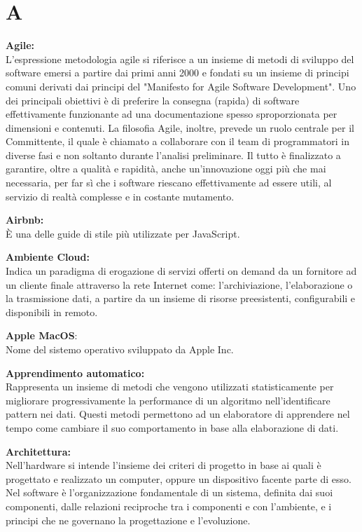\documentclass[a4paper, oneside, openany, dvipsnames, table]{article}
\begin{document}
\copertina{}


\newpage
\tableofcontents
\newpage


\newpage
\section{A}  
\textbf{Agile:} \\ L'espressione metodologia agile si riferisce a un insieme di metodi di sviluppo del software emersi a partire dai 
primi anni 2000 e fondati su un insieme di principi comuni derivati dai principi del "Manifesto for Agile Software Development".
Uno dei principali 
obiettivi è di preferire la consegna (rapida) di software effettivamente funzionante ad una documentazione spesso sproporzionata 
per dimensioni e contenuti.
La filosofia Agile, inoltre, prevede un ruolo centrale per il Committente, il quale è chiamato a 
collaborare con il team di programmatori in diverse fasi e non soltanto durante l’analisi preliminare. 
Il tutto è finalizzato a garantire, oltre a qualità e rapidità, anche un’innovazione oggi più che mai necessaria, 
per far sì che i software riescano effettivamente ad essere utili, al servizio di realtà complesse e in costante mutamento.

\textbf{Airbnb:} \\ \`E una delle guide di stile più utilizzate per JavaScript.

\textbf{Ambiente Cloud:}\\	 Indica un paradigma di erogazione di servizi offerti on demand da un fornitore ad un cliente finale attraverso la rete Internet come: l'archiviazione, l'elaborazione o la trasmissione dati, a partire da un insieme di risorse preesistenti, configurabili e disponibili in remoto.

\textbf{Apple MacOS}:\\ Nome del sistemo operativo sviluppato da Apple Inc.

\label{par:appr_auto}
\textbf{Apprendimento automatico:}\\	Rappresenta un insieme di metodi che vengono utilizzati statisticamente per migliorare progressivamente la performance di un algoritmo nell'identificare pattern nei dati. Questi metodi  permettono ad un elaboratore di apprendere nel tempo come cambiare il suo comportamento in base alla elaborazione di dati.

\textbf{Architettura:} \\ Nell'hardware si intende l'insieme dei criteri di progetto in base ai quali è progettato e realizzato un computer, oppure un dispositivo facente parte di esso. Nel software è l'organizzazione fondamentale di un sistema, definita dai suoi componenti, dalle relazioni reciproche tra i componenti e con l'ambiente, e i principi che ne governano la progettazione e l'evoluzione.
\end{document}
